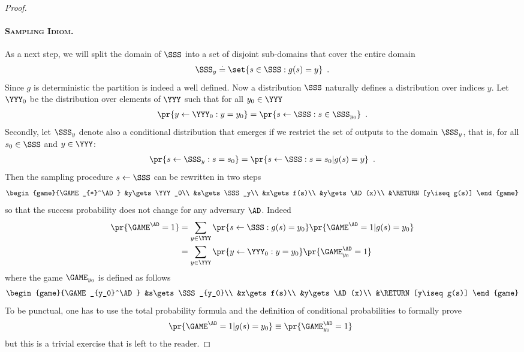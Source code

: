 \documentclass{llncs}
\begin{document}
\begin{proof}
\paragraph{\textsc{Sampling Idiom}.}
As a next step, we will split the domain of $\SSS$ into a set of
disjoint sub-domains that cover the entire domain
\begin{align*}
  \SSS_y\doteq\set{s\in\SSS: g(s)=y}\enspace.
\end{align*}
Since $g$ is deterministic the partition is indeed a well defined. Now
a distribution $\SSS$ naturally defines a distribution over indices
$y$. Let $\YYY_0$ be the distribution over elements of $\YYY$ such that
for all $y_0\in\YYY$
\begin{align*}
  \pr{y\gets\YYY_0:y=y_0}=\pr{s\gets\SSS:s\in\SSS_{y_0}}\enspace.
\end{align*}
Secondly, let $\SSS_y$ denote also a conditional distribution that
emerges if we restrict the set of outputs to the domain $\SSS_y$, that
is, for all $s_0\in\SSS$ and $y\in\YYY$:
\begin{align*}
  \pr{s\gets\SSS_y:s=s_0}=\pr{s\gets \SSS: s=s_0|g(s)=y}\enspace.
\end{align*}
Then the sampling procedure $s\gets\SSS$ can be rewritten in two steps
\begin{align*}
  \begin{game}{\GAME_{*}^\AD}
    &y\gets\YYY_0\\
    &s\gets\SSS_y\\
    &x\gets f(s)\\
    &y\gets\AD(x)\\
    &\RETURN [y\iseq g(s)]
  \end{game}
\end{align*}
so that the success probability does not change for any adversary
$\AD$. Indeed
\begin{align*}
  \pr{\GAME^{\AD}=1}%
  &= \sum_{y\in\YYY}\pr{s\gets\SSS: g(s)=y_0}\pr{\GAME^{\AD}=1|g(s)=y_0}\\
  &= \sum_{y\in\YYY}\pr{y\gets\YYY_0: y=y_0}\pr{\GAME_{y_0}^{\AD}=1}
\end{align*}
where the game $\GAME_{y_0}$ is defined as follows
\begin{align*}
  \begin{game}{\GAME_{y_0}^\AD}
    &s\gets\SSS_{y_0}\\
    &x\gets f(s)\\
    &y\gets\AD(x)\\
    &\RETURN [y\iseq g(s)]
  \end{game}  
\end{align*}
To be punctual, one has to use the total probability formula and the
definition of conditional probabilities to formally prove
\begin{align*}
 \pr{\GAME^{\AD}=1|g(s)=y_0}\equiv  \pr{\GAME_{y_0}^{\AD}=1}\enspace
\end{align*}
but this is a trivial exercise that is left to the reader. 


\end{proof}
\end{document}
